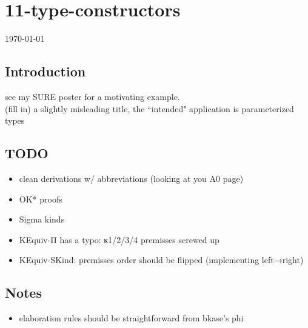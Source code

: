 \documentclass[12pt]{article}
\begin{document}
\section*{11-type-constructors}
\today
\subsection*{Introduction}
see my SURE poster for a motivating example. \\
(fill in) a slightly misleading title, the ``intended" application is parameterized types
\subsection*{TODO}
\begin{itemize}
    \item clean derivations w/ abbreviations (looking at you A0 page)
    \item OK* proofs
    \item Sigma kinds
    \item KEquiv-Π has a typo: κ1/2/3/4 premisses screwed up
    \item KEquiv-SKind: premisses order should be flipped (implementing left→right)
\end{itemize}
\subsection*{Notes}
\begin{itemize}
    \item elaboration rules should be straightforward from bkase's phi
\end{itemize}
\end{document}
